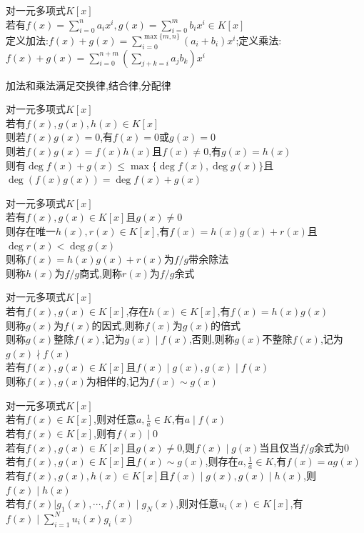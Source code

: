 \begin{dingyi}
对一元多项式$K[x]$\\
若有$f(x)=\sum\limits_{i=0}^{n}a_ix^i,g(x)=\sum\limits_{i=0}^{m}b_ix^i\in K[x]$\\
定义加法:$f(x)+g(x)=\sum\limits_{i=0}^{\max\{m,n\}}(a_i+b_i)x^i$;定义乘法:$f(x)+g(x)=\sum\limits_{i=0}^{n+m}(\sum\limits_{j+k=i}a_jb_k)x^i$
\end{dingyi}

\begin{zhu}
加法和乘法满足交换律,结合律,分配律
\end{zhu}

\begin{dingli}
对一元多项式$K[x]$\\
若有$f(x),g(x),h(x)\in K[x]$\\
则若$f(x)g(x)=0$,有$f(x)=0$或$g(x)=0$\\
则若$f(x)g(x)=f(x)h(x)$且$f(x)\neq0$,有$g(x)=h(x)$\\
则有$\deg f(x)+g(x)\leq \max\{\deg f(x),\deg g(x)\}$且$\deg(f(x)g(x))=\deg f(x)+g(x)$
\end{dingli}

\begin{dingli}
对一元多项式$K[x]$\\
若有$f(x),g(x)\in K[x]$且$g(x)\neq0$\\
则存在唯一$h(x),r(x)\in K[x]$,有$f(x)=h(x)g(x)+r(x)$且$\deg r(x)<\deg g(x)$\\
则称$f(x)=h(x)g(x)+r(x)$为$f/g$带余除法\\
则称$h(x)$为$f/g$商式,则称$r(x)$为$f/g$余式
\end{dingli}

\begin{dingyi}
对一元多项式$K[x]$\\
若有$f(x),g(x)\in K[x]$,存在$h(x)\in K[x]$,有$f(x)=h(x)g(x)$\\
则称$g(x)$为$f(x)$的因式,则称$f(x)$为$g(x)$的倍式\\
则称$g(x)$整除$f(x)$,记为$g(x)\mid f(x)$,否则,则称$g(x)$不整除$f(x)$,记为$g(x)\nmid f(x)$\\
若有$f(x),g(x)\in K[x]$且$f(x)\mid g(x),g(x)\mid f(x)$\\
则称$f(x),g(x)$为相伴的,记为$f(x)\sim g(x)$
\end{dingyi}

\begin{dingli}
对一元多项式$K[x]$\\
若有$f(x)\in K[x]$,则对任意$a,\frac{1}{a}\in K$,有$a\mid f(x)$\\
若有$f(x)\in K[x]$,则有$f(x)\mid 0$\\
若有$f(x),g(x)\in K[x]$且$g(x)\neq0$,则$f(x)\mid g(x)$当且仅当$f/g$余式为$0$\\
若有$f(x),g(x)\in K[x]$且$f(x)\sim g(x)$,则存在$a,\frac{1}{a}\in K$,有$f(x)=ag(x)$\\
若有$f(x),g(x),h(x)\in K[x]$且$f(x)\mid g(x),g(x)\mid h(x)$,则$f(x)\mid h(x)$\\
若有$f(x)|g_1(x),\cdots,f(x)\mid g_N(x)$,则对任意$u_i(x)\in K[x]$,有$f(x)\mid \sum\limits_{i=1}^{N}u_i(x)g_i(x)$
\end{dingli}


